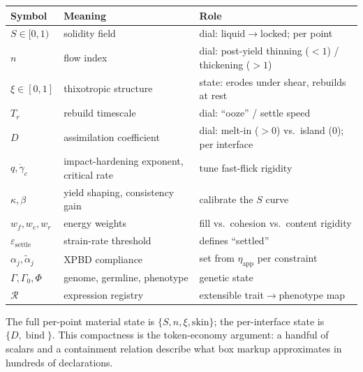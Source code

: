 \documentclass[11pt]{article}
\DeclareMathOperator{\bind}{bind}
\newcommand{\R}{\mathcal{R}}
\newcommand{\Gnome}{\Gamma}
\newcommand{\Phe}{\Phi}
\newcommand{\rate}{\dot{\gamma}}
\begin{document}
\begin{center}
\begin{tabular}{@{}lll@{}}
\toprule
Symbol & Meaning & Role \\
\midrule
$S\in[0,1)$ & solidity field & dial: liquid$\to$locked; per point \\
$n$ & flow index & dial: post-yield thinning ($<1$) / thickening ($>1$) \\
$\xi\in[0,1]$ & thixotropic structure & state: erodes under shear, rebuilds at rest \\
$T_r$ & rebuild timescale & dial: ``ooze'' / settle speed \\
$D$ & assimilation coefficient & dial: melt-in ($>0$) vs.\ island ($0$); per interface \\
$q,\rate_c$ & impact-hardening exponent, critical rate & tune fast-flick rigidity \\
$\kappa,\beta$ & yield shaping, consistency gain & calibrate the $S$ curve \\
$w_f,w_c,w_r$ & energy weights & fill vs.\ cohesion vs.\ content rigidity \\
$\varepsilon_{\text{settle}}$ & strain-rate threshold & defines ``settled'' \\
$\alpha_j,\tilde{\alpha}_j$ & XPBD compliance & set from $\eta_{\text{app}}$ per constraint \\
$\Gnome,\Gnome_0,\Phe$ & genome, germline, phenotype & genetic state \\
$\R$ & expression registry & extensible trait$\to$phenotype map \\
\bottomrule
\end{tabular}
\end{center}

\noindent The full per-point material state is $\{S,n,\xi,\text{skin}\}$; the per-interface state
is $\{D,\bind\}$. This compactness is the token-economy argument: a handful of scalars and a
containment relation describe what box markup approximates in hundreds of declarations.
\end{document}
